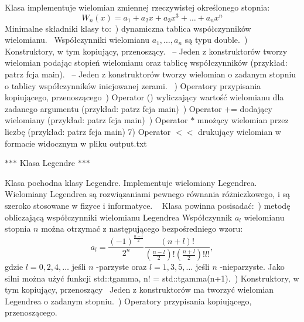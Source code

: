 Klasa implementuje wielomian zmiennej rzeczywistej określonego stopnia\+: \[ W_n(x) = a_1 + a_2 x + a_3 x^3 + \dots + a_n x^n \] Minimalne składniki klasy to\+:~) dynamiczna tablica współczynników wielomianu.~\newline
 Współczynniki wielomianu $ a_1,\dots,a_n $ są typu double.~) Konstruktory, w tym kopiujący, przenoszący.~\newline
 -- Jeden z konstruktorów tworzy wielomian podając stopień wielomianu oraz tablicę współczynników (przykład\+: patrz fcja main).~\newline
 -- Jeden z konstruktorów tworzy wielomian o zadanym stopniu o tablicy współczynników inicjowanej zerami. ~) Operatory przypisania kopiującego, przenoszącego~) Operator () wyliczający wartość wielomianu dla zadanego argumentu (przykład\+: patrz fcja main)~) Operator += dodający wielomiany (przykład\+: patrz fcja main)~) Operator $\ast$ mnożący wielomian przez liczbę (przykład\+: patrz fcja main) 7) Operator $<$$<$ drukujący wielomian w formacie widocznym w pliku output.\+txt ~\newline
~\newline




$\ast$$\ast$$\ast$ Klasa Legendre $\ast$$\ast$$\ast$

Klasa pochodna klasy Legendre. Implementuje wielomiany Legendre\textquotesingle{}a.~\newline
Wielomiany Legendre\textquotesingle{}a są rozwiązaniami pewnego równania różniczkowego, i są szeroko stosowane w fizyce i informatyce. ~\newline
Klasa powinna posisadać\+:~) metodę obliczającą współczynniki wielomianu Legendre\textquotesingle{}a Współczynnik $ a_l $ wielomianu stopnia $ n $ można otrzymać z następującego bezpośredniego wzoru\+: \[ a_l = \frac{(-1)^{\frac{n-l}{2}}}{2^n} \frac{ (n+l)! } { (\frac{n-l}{2})! (\frac{n+l}{2})! l! } , \] gdzie $ l=0,2,4,\dots $ jeśli $ n $ -\/parzyste oraz $ l=1,3,5,\dots $ jeśli $ n $ -\/nieparzyste. Jako silni można użyć funkcji std\+::tgamma, n! = std\+::tgamma(n+1).~) Konstruktory, w tym kopiujący, przenoszący~\newline
 Jeden z konstruktorów ma tworzyć wielomian Legendre\textquotesingle{}a o zadanym stopniu.~) Operatory przypisania kopiującego, przenoszącego. 